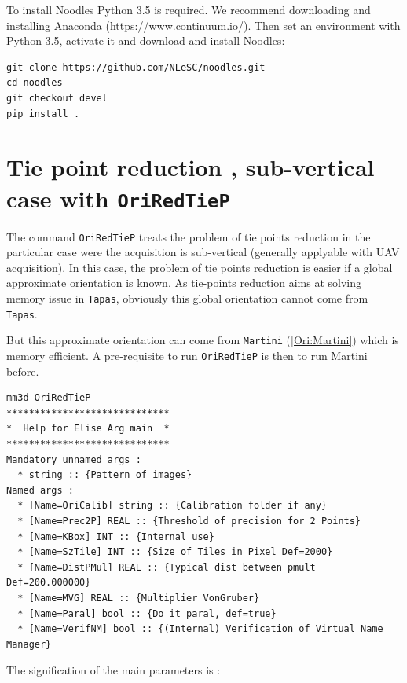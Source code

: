 To install Noodles Python 3.5 is required. We recommend downloading and installing Anaconda (https://www.continuum.io/). Then set an environment with Python 3.5, activate it and download and install Noodles:
\begin{verbatim}
git clone https://github.com/NLeSC/noodles.git
cd noodles
git checkout devel
pip install .
\end{verbatim}


\section{Tie point reduction , sub-vertical case with {\tt OriRedTieP}}

The command {\tt OriRedTieP} treats the problem of tie points reduction in the particular case
were the acquisition is sub-vertical (generally applyable with UAV acquisition). In this
case, the problem of tie points reduction is easier if a global approximate orientation is known.
As tie-points reduction aims at solving memory issue in {\tt Tapas},
obviously this global orientation cannot come from {\tt Tapas}.

But this approximate orientation can come from {\tt Martini} (\ref{Ori:Martini})
 which is memory efficient.
A pre-requisite to run {\tt OriRedTieP} is then to run Martini before.

\begin{verbatim}
mm3d OriRedTieP
*****************************
*  Help for Elise Arg main  *
*****************************
Mandatory unnamed args : 
  * string :: {Pattern of images}
Named args : 
  * [Name=OriCalib] string :: {Calibration folder if any}
  * [Name=Prec2P] REAL :: {Threshold of precision for 2 Points}
  * [Name=KBox] INT :: {Internal use}
  * [Name=SzTile] INT :: {Size of Tiles in Pixel Def=2000}
  * [Name=DistPMul] REAL :: {Typical dist between pmult Def=200.000000}
  * [Name=MVG] REAL :: {Multiplier VonGruber}
  * [Name=Paral] bool :: {Do it paral, def=true}
  * [Name=VerifNM] bool :: {(Internal) Verification of Virtual Name Manager}
\end{verbatim}

The signification of the main parameters is :

